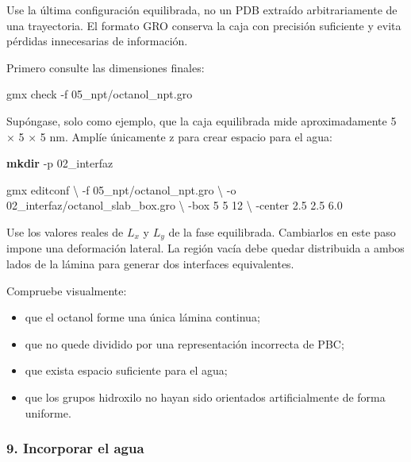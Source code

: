 \documentclass[
  spanish,
  11pt,
  a4paper]{article}
\newenvironment{Shaded}{\begin{snugshade}}{\end{snugshade}}
\newcommand{\AttributeTok}[1]{\textcolor[rgb]{0.13,0.29,0.53}{#1}}
\newcommand{\DataTypeTok}[1]{\textcolor[rgb]{0.13,0.29,0.53}{#1}}
\newcommand{\ExtensionTok}[1]{#1}
\newcommand{\FunctionTok}[1]{\textcolor[rgb]{0.13,0.29,0.53}{\textbf{#1}}}
\newcommand{\NormalTok}[1]{#1}
\providecommand{\tightlist}{%
  \setlength{\itemsep}{0pt}\setlength{\parskip}{0pt}}
\begin{document}
Use la última configuración equilibrada, no un PDB extraído
arbitrariamente de una trayectoria. El formato GRO conserva la caja con
precisión suficiente y evita pérdidas innecesarias de información.

Primero consulte las dimensiones finales:

\begin{Shaded}
\begin{Highlighting}[]
\ExtensionTok{gmx}\NormalTok{ check }\AttributeTok{{-}f}\NormalTok{ 05\_npt/octanol\_npt.gro}
\end{Highlighting}
\end{Shaded}

Supóngase, solo como ejemplo, que la caja equilibrada mide
aproximadamente 5 × 5 × 5 nm. Amplíe únicamente z para crear espacio
para el agua:

\begin{Shaded}
\begin{Highlighting}[]
\FunctionTok{mkdir} \AttributeTok{{-}p}\NormalTok{ 02\_interfaz}

\ExtensionTok{gmx}\NormalTok{ editconf }\DataTypeTok{\textbackslash{}}
    \AttributeTok{{-}f}\NormalTok{ 05\_npt/octanol\_npt.gro }\DataTypeTok{\textbackslash{}}
    \AttributeTok{{-}o}\NormalTok{ 02\_interfaz/octanol\_slab\_box.gro }\DataTypeTok{\textbackslash{}}
    \AttributeTok{{-}box}\NormalTok{ 5 5 12 }\DataTypeTok{\textbackslash{}}
    \AttributeTok{{-}center}\NormalTok{ 2.5 2.5 6.0}
\end{Highlighting}
\end{Shaded}

Use los valores reales de \(L_x\) y \(L_y\) de la fase equilibrada.
Cambiarlos en este paso impone una deformación lateral. La región vacía
debe quedar distribuida a ambos lados de la lámina para generar dos
interfaces equivalentes.

Compruebe visualmente:

\begin{itemize}
\tightlist
\item
  que el octanol forme una única lámina continua;
\item
  que no quede dividido por una representación incorrecta de PBC;
\item
  que exista espacio suficiente para el agua;
\item
  que los grupos hidroxilo no hayan sido orientados artificialmente de
  forma uniforme.
\end{itemize}

\subsubsection{9. Incorporar el agua}\label{incorporar-el-agua}
\end{document}
